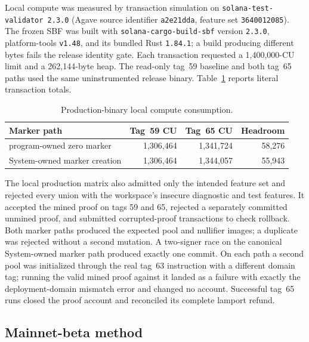Local compute was measured by transaction simulation on
\texttt{solana-test-validator 2.3.0} (Agave source identifier
\texttt{a2e21dda}, feature set \texttt{3640012085}).  The frozen SBF was built
with \nolinkurl{solana-cargo-build-sbf} version \texttt{2.3.0}, platform-tools
\texttt{v1.48}, and its bundled Rust \texttt{1.84.1}; a build producing
different bytes fails the release identity gate.  Each transaction
requested a 1,400,000-CU limit and a 262,144-byte heap.  The read-only tag~59
baseline and both tag~65 paths used the same uninstrumented release binary.
Table~\ref{tab:production-cu} reports literal transaction totals.

\begin{table}[t]
  \centering
  \small
  \caption{Production-binary local compute consumption.}
  \label{tab:production-cu}
  \begin{tabular}{l r r r}
    \toprule
    Marker path & Tag~59 CU & Tag~65 CU & Headroom \\
    \midrule
    program-owned zero marker & 1,306,464 & 1,341,724 & 58,276 \\
    System-owned marker creation & 1,306,464 & 1,344,057 & 55,943 \\
    \bottomrule
  \end{tabular}
\end{table}

The local production matrix also admitted only the intended feature set and
rejected every union with the workspace's insecure diagnostic and test
features.  It accepted
the mined proof on tags 59 and 65, rejected a separately committed unmined
proof, and submitted corrupted-proof transactions to check rollback.  Both
marker paths produced the expected pool and nullifier images; a duplicate was
rejected without a second mutation.  A two-signer race on the canonical
System-owned marker path produced exactly one commit.  On each path a second
pool was initialized through the real tag~63 instruction with a different
domain tag; running the valid mined proof against it landed as a failure
with exactly the deployment-domain mismatch error and changed no account.
Successful tag~65 runs closed the proof account and reconciled its complete
lamport refund.

\subsection{Mainnet-beta method}
\label{sec:evaluation-mainnet-method}

